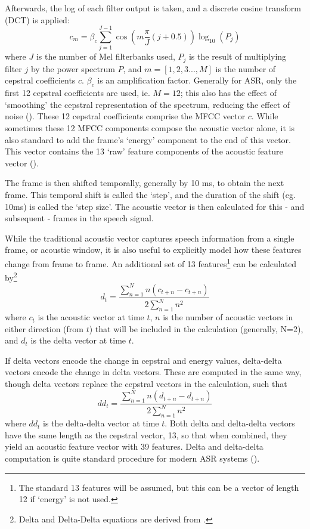 Afterwards, the log of each filter output is taken, and a discrete cosine transform (DCT) is applied: \begin{equation} c_m = \beta_c \sum_{j=1}^{J-1} \cos(m\dfrac{\pi}{J} (j+0.5)) \log_{10} (P_j) \end{equation} where $J$ is the number of Mel filterbanks used, $P_j$ is the result of multiplying filter $j$ by the power spectrum $P$, and $m=[1,2,3...,M]$ is the number of cepstral coefficients $c$.  $\beta_c$ is an amplification factor.  Generally for ASR, only the first 12 cepstral coefficients are used, ie. $M=12$; this also has the effect of `smoothing' the cepstral representation of the spectrum, reducing the effect of noise (\cite{gold:11}).  These 12 cepstral coefficients comprise the MFCC vector $c$.  While sometimes these 12 MFCC components compose the acoustic vector alone, it is also standard to add the frame's `energy' component to the end of this vector.  This vector contains the 13 `raw' feature components of the acoustic feature vector (\cite{jurafsky:09}).  

The frame is then shifted temporally, generally by 10 ms, to obtain the next frame. This temporal shift is called the `step', and the duration of the shift (eg. 10ms) is called the `step size'.  The acoustic vector is then calculated for this - and subsequent - frames in the speech signal.

While the traditional acoustic vector captures speech information from a single frame, or acoustic window, it is also useful to explicitly model how these features change from frame to frame.  An additional set of 13 features\footnote{The standard 13 features will be assumed, but this can be a vector of length 12 if `energy' is not used.} can be calculated by\footnote{Delta and Delta-Delta equations are derived from \cite{gold:11}.} \begin{equation} d_t = \dfrac{\sum_{n=1}^{N} n(c_{t+n} - c_{t+n})}{2\sum_{n=1}^{N} n^2} \end{equation} where $c_t$ is the acoustic vector at time $t$, $n$ is the number of acoustic vectors in either direction (from $t$) that will be included in the calculation (generally, N=2), and $d_t$ is the delta vector at time $t$.  

If delta vectors encode the change in cepstral and energy values, delta-delta vectors encode the change in delta vectors.  These are computed in the same way, though delta vectors replace the cepstral vectors in the calculation, such that \begin{equation} dd_t = \dfrac{\sum_{n=1}^{N} n(d_{t+n} - d_{t+n})}{2\sum_{n=1}^{N} n^2} \end{equation} where $dd_t$ is the delta-delta vector at time $t$.  Both delta and delta-delta vectors have the same length as the cepstral vector, 13, so that when combined, they yield an acoustic feature vector with 39 features.  %
Delta and delta-delta computation is quite standard procedure for modern ASR systems (\cite{htk:15}).


